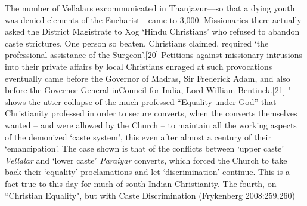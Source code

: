 {The number of Vellalars excommunicated in Thanjavur—so that a dying youth was denied elements of the Eucharist—came to 3,000. Missionaries there actually asked the District Magistrate to Xog ‘Hindu Christians’ who refused to abandon caste strictures. One person so beaten, Christians claimed, required ‘the professional assistance of the Surgeon’.[20] Petitions against missionary intrusions into their private affairs by local Christians enraged at such provocations eventually came before the Governor of Madras, Sir Frederick Adam, and also before the Governor-General-inCouncil for India, Lord William Bentinck.[21] "} shows the utter collapse of the much professed “Equality under God” that Christianity professed in order to secure converts, when the converts themselves wanted – and were allowed by the Church – to maintain all the working aspects of the demonized ‘caste system’, this even after almost a century of their ‘emancipation’. The case shown is that of the conflicts between ‘upper caste’ \textit{Vellalar} and ‘lower caste’ \textit{Paraiyar} converts, which forced the Church to take back their ‘equality’ proclamations and let ‘discrimination’ continue. This is a fact true to this day for much of south Indian Christianity. The fourth, on “Christian Equality", but with Caste Discrimination (Frykenberg 2008:259,260)

